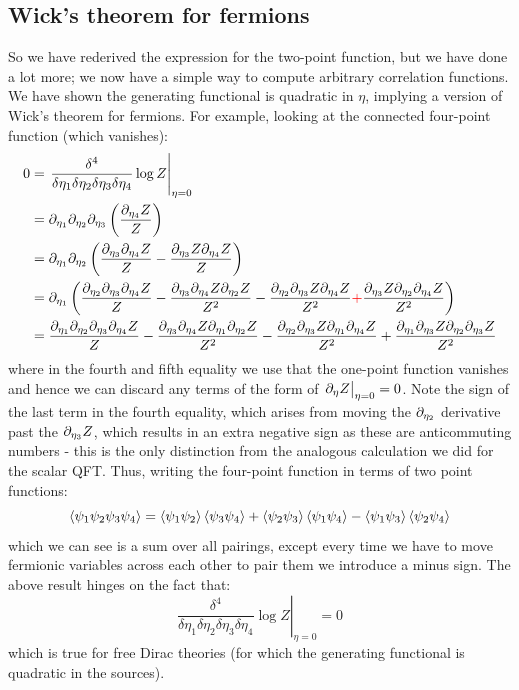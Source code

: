 \subsection{Wick's theorem for fermions}
So we have rederived the expression for the two-point function, but we have done a lot more; we now have a simple way to compute arbitrary correlation functions. We have shown the generating functional is quadratic in $\eta$, implying a version of Wick's theorem for fermions. For example, looking at the connected four-point function (which vanishes):
\begin{equation}
    \begin{split}
        0 &= \left.\frac{\delta^4}{\delta\eta_1\delta\eta_2\delta\eta_3\delta\eta_4}\log Z\right|_{\eta=0} 
        \\ &= \partial_{\eta_1}\partial_{\eta_2}\partial_{\eta_3}\left(\frac{\partial_{\eta_4} Z}{Z}\right) 
        \\ &= \partial_{\eta_1}\partial_{\eta_2}\left(\frac{\partial_{\eta_3}\partial_{\eta_4}Z}{Z} - \frac{\partial_{\eta_3}Z\partial_{\eta_4}Z}{Z}\right)
        \\ &= \partial_{\eta_1}\left(\frac{\partial_{\eta_2}\partial_{\eta_3}\partial_{\eta_4}Z}{Z} - \frac{\partial_{\eta_3}\partial_{\eta_4}Z\partial_{\eta_2}Z}{Z^2} - \frac{\partial_{\eta_2}\partial_{\eta_3}Z\partial_{\eta_4}Z}{Z^2} \textcolor{red}{+} \frac{\partial_{\eta_3}Z\partial_{\eta_2}\partial_{\eta_4}Z}{Z^2}\right)
        \\ &= \frac{\partial_{\eta_1}\partial_{\eta_2}\partial_{\eta_3}\partial_{\eta_4}Z}{Z} - \frac{\partial_{\eta_3}\partial_{\eta_4}Z\partial_{\eta_1}\partial_{\eta_2}Z}{Z^2} - \frac{\partial_{\eta_2}\partial_{\eta_3}Z\partial_{\eta_1}\partial_{\eta_4}Z}{Z^2} + \frac{\partial_{\eta_1}\partial_{\eta_3}Z\partial_{\eta_2}\partial_{\eta_3}Z}{Z^2}
    \end{split}
\end{equation}
where in the fourth and fifth equality we use that the one-point function vanishes and hence we can discard any terms of the form of $\left. \partial_{\eta}Z \right|_{\eta=0} = 0$. Note the sign of the last term in the fourth equality, which arises from moving the $\partial_{\eta_2}$ derivative past the $\partial_{\eta_3}Z$, which results in an extra negative sign as these are anticommuting numbers - this is the only distinction from the analogous calculation we did for the scalar QFT. Thus, writing the four-point function in terms of two point functions:
\begin{equation}
    \left< \psi_1\psi_2\psi_3\psi_4 \right> = \left< \psi_1\psi_2 \right>\left< \psi_3\psi_4 \right> + \left< \psi_2\psi_3 \right>\left< \psi_1\psi_4 \right> - \left< \psi_1\psi_3 \right>\left< \psi_2\psi_4 \right>
\end{equation}
which we can see is a sum over all pairings, except every time we have to move fermionic variables across each other to pair them we introduce a minus sign. The above result hinges on the fact that:
\begin{equation}
    \left.\frac{\delta^4}{\delta\eta_1\delta\eta_2\delta\eta_3\delta\eta_4}\log Z\right|_{\eta=0}  = 0
\end{equation} 
which is true for free Dirac theories (for which the generating functional is quadratic in the sources).

